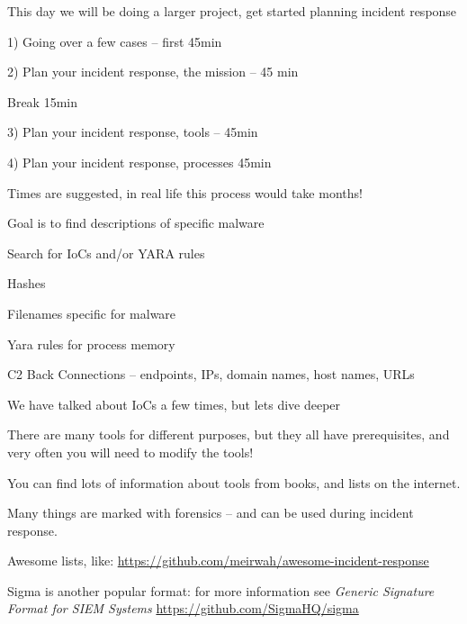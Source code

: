 \documentclass[Screen16to9,17pt]{foils}
\begin{document}
This day we will be doing a larger project, get started planning incident response
\begin{list2}
\item 1) Going over a few cases -- first 45min
\item 2) Plan your incident response, the mission -- 45 min
\item Break 15min
\item 3) Plan your incident response, tools -- 45min
\item 4) Plan your incident response, processes 45min
\end{list2}

Times are suggested, in real life this process would take months!



Goal is to find descriptions of specific malware
\begin{quote}

\end{quote}

Search for IoCs and/or YARA rules
\begin{list2}
\item Hashes
\item Filenames specific for malware
\item Yara rules for process memory
\item C2 Back Connections -- endpoints, IPs, domain names, host names, URLs
\end{list2}




We have talked about IoCs a few times, but lets dive deeper

There are many tools for different purposes, but they all have prerequisites, and very often you will need to modify the tools!

You can find lots of information about tools from books, and lists on the internet.

Many things are marked with forensics -- and can be used during incident response.

\begin{list2}
    \item Awesome lists, like: \url{https://github.com/meirwah/awesome-incident-response}
    \item Sigma is another popular format: for more information see \emph{Generic Signature Format for SIEM Systems}
    \url{https://github.com/SigmaHQ/sigma}
\end{list2}
\end{document}
